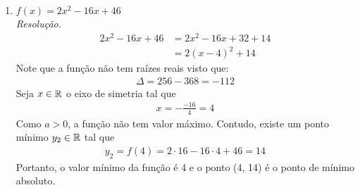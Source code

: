 \begin{enumerate}
    \item $f(x) = 2x^2 - 16x + 46$ \\
    \emph{Resolução.}
    \begin{align*}
        2x^2 - 16x + 46 &= 2x^2 - 16x + 32 + 14 \\ &= 
        2(x-4)^2 + 14
    \end{align*}
    Note que a função não tem raízes reais visto que:
    \begin{align*}
        \Delta = 256 - 368 = -112
    \end{align*}
    Seja $x \in \mathbb R$ o eixo de simetria tal que
    \begin{align*}
        x = -\frac{-16}{4} = 4
    \end{align*}
    Como $a > 0$, a função não tem valor máximo. Contudo, existe um ponto mínimo $y_2 \in \mathbb R$ tal que
    \begin{align*}
        y_2 = f(4) = 2 \cdot 16 - 16 \cdot 4 + 46 = 14 
    \end{align*}
    Portanto, o valor mínimo da função é 4 e o ponto (4, 14) é o ponto de mínimo absoluto.
\end{enumerate}